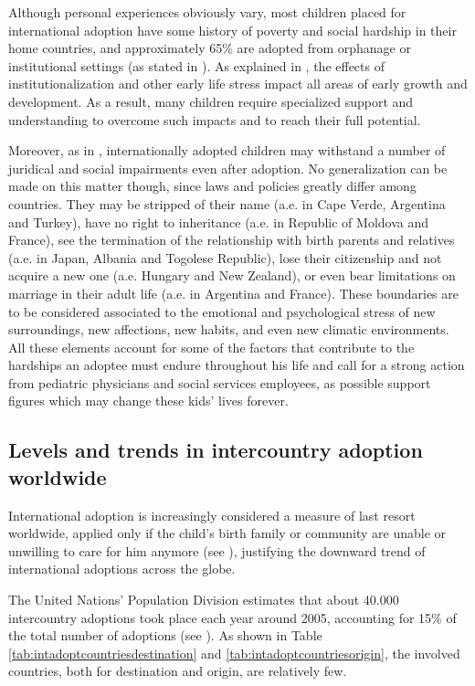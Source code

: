 Although personal experiences obviously vary, most children placed for international adoption have some history of poverty and social hardship in their home countries, and approximately 65\% are adopted from orphanage or institutional settings (as stated in \cite{caringfor}). As explained in \cite{nelson}, the effects of institutionalization and other early life stress impact all areas of early growth and development. As a result, many children require specialized support and understanding to overcome such impacts and to reach their full potential. 

Moreover, as in \cite{unreport}, internationally adopted children may withstand a number of juridical and social impairments even after adoption. No generalization can be made on this matter though, since laws and policies greatly differ among countries. They may be stripped of their name (a.e. in Cape Verde, Argentina and Turkey), have no right to inheritance (a.e. in Republic of Moldova and France), see the termination of the relationship with birth parents and relatives (a.e. in Japan, Albania and Togolese Republic), lose their citizenship and not acquire a new one (a.e. Hungary and New Zealand), or even bear limitations on marriage in their adult life (a.e. in Argentina and France). These boundaries are to be considered associated to the emotional and psychological stress of new surroundings, new affections, new habits, and even new climatic environments.\\
All these elements account for some of the factors that contribute to the hardships an adoptee must endure throughout his life and call for a strong action from pediatric physicians and social services employees, as possible support figures which may change these kids' lives forever.

\subsection{Levels and trends in intercountry adoption worldwide}\label{sub:levelsintercountry}
International adoption is increasingly considered a measure of last resort worldwide, applied only if the child's birth family or community are unable or unwilling to care for him anymore (see \cite{nelson}), justifying the downward trend of international adoptions across the globe. 

The United Nations' Population Division estimates that about 40.000 intercountry adoptions took place each year around 2005, accounting for 15\% of the total number of adoptions (see \cite{unreport}). As shown in Table \ref{tab:intadoptcountriesdestination} and \ref{tab:intadoptcountriesorigin}, the involved countries, both for destination and origin, are relatively few.

